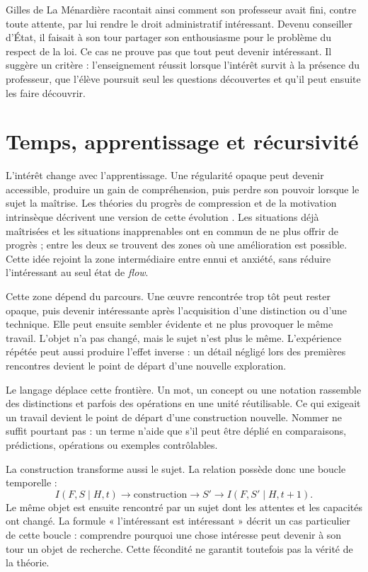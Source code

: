 \documentclass[11pt,a4paper]{article}
\begin{document}
Gilles de La Ménardière racontait ainsi comment son professeur avait fini, contre
toute attente, par lui rendre le droit administratif intéressant. Devenu
conseiller d'État, il faisait à son tour partager son enthousiasme pour le
problème du respect de la loi. Ce cas ne prouve pas que tout peut devenir
intéressant. Il suggère un critère : l'enseignement réussit lorsque l'intérêt
survit à la présence du professeur, que l'élève poursuit seul les questions
découvertes et qu'il peut ensuite les faire découvrir.

\section{Temps, apprentissage et récursivité}

L'intérêt change avec l'apprentissage. Une régularité opaque peut devenir
accessible, produire un gain de compréhension, puis perdre son pouvoir lorsque
le sujet la maîtrise. Les théories du progrès de compression et de la motivation
intrinsèque décrivent une version de cette évolution
\parencite{schmidhuber2009compression,oudeyer2007intrinsic}. Les situations déjà
maîtrisées et les situations inapprenables ont en commun de ne plus offrir de
progrès ; entre les deux se trouvent des zones où une amélioration est possible.
Cette idée rejoint la zone intermédiaire entre ennui et anxiété, sans réduire
l'intéressant au seul état de \emph{flow}.

Cette zone dépend du parcours. Une œuvre rencontrée trop tôt peut rester opaque,
puis devenir intéressante après l'acquisition d'une distinction ou d'une
technique. Elle peut ensuite sembler évidente et ne plus provoquer le même
travail. L'objet n'a pas changé, mais le sujet n'est plus le même. L'expérience
répétée peut aussi produire l'effet inverse : un détail négligé lors des
premières rencontres devient le point de départ d'une nouvelle exploration.

Le langage déplace cette frontière. Un mot, un concept ou une notation rassemble
des distinctions et parfois des opérations en une unité réutilisable. Ce qui
exigeait un travail devient le point de départ d'une construction nouvelle.
Nommer ne suffit pourtant pas : un terme n'aide que s'il peut être déplié en
comparaisons, prédictions, opérations ou exemples contrôlables.

La construction transforme aussi le sujet. La relation possède donc une boucle
temporelle :
\[
 I(F,S\mid H,t)\longrightarrow \text{construction}\longrightarrow S'
 \longrightarrow I(F,S'\mid H,t+1).
\]
Le même objet est ensuite rencontré par un sujet dont les attentes et les
capacités ont changé. La formule « l'intéressant est intéressant » décrit un
cas particulier de cette boucle : comprendre pourquoi une chose intéresse peut
devenir à son tour un objet de recherche. Cette fécondité ne garantit toutefois
pas la vérité de la théorie.
\end{document}
